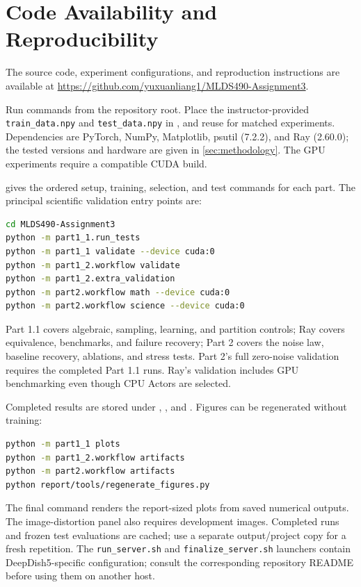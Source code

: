 \section{Code Availability and Reproducibility}\label{sec:reproduction}
The source code, experiment configurations, and reproduction instructions are available at \url{https://github.com/yuxuanliang1/MLDS490-Assignment3}.

Run commands from the repository root. Place the instructor-provided \texttt{train\_data.npy} and \texttt{test\_data.npy} in , and reuse  for matched experiments. Dependencies are PyTorch, NumPy, Matplotlib, psutil (7.2.2), and Ray (2.60.0); the tested versions and hardware are given in \cref{sec:methodology}. The GPU experiments require a compatible CUDA build.

 gives the ordered setup, training, selection, and test commands for each part. The principal scientific validation entry points are:
\begin{lstlisting}[language=bash]
cd MLDS490-Assignment3
python -m part1_1.run_tests
python -m part1_1 validate --device cuda:0
python -m part1_2.workflow validate
python -m part1_2.extra_validation
python -m part2.workflow math --device cuda:0
python -m part2.workflow science --device cuda:0
\end{lstlisting}
Part 1.1 covers algebraic, sampling, learning, and partition controls; Ray covers equivalence, benchmarks, and failure recovery; Part 2 covers the noise law, baseline recovery, ablations, and stress tests. Part 2's full zero-noise validation requires the completed Part 1.1 runs. Ray's validation includes GPU benchmarking even though CPU Actors are selected.

Completed results are stored under , , and . Figures can be regenerated without training:
\begin{lstlisting}[language=bash]
python -m part1_1 plots
python -m part1_2.workflow artifacts
python -m part2.workflow artifacts
python report/tools/regenerate_figures.py
\end{lstlisting}
The final command renders the report-sized plots from saved numerical outputs. The image-distortion panel also requires development images. Completed runs and frozen test evaluations are cached; use a separate output/project copy for a fresh repetition. The \texttt{run\_server.sh} and \texttt{finalize\_server.sh} launchers contain DeepDish5-specific configuration; consult the corresponding repository README before using them on another host.
